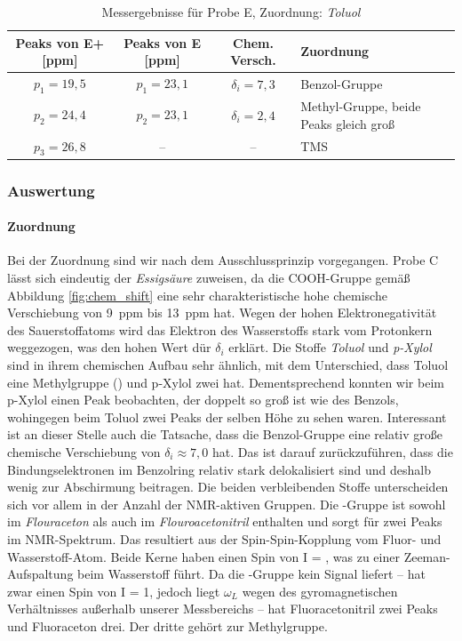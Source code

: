 \documentclass[a4paper]{scrartcl} %
\begin{document}
\begin{table}[!htb]
	\centering
	\caption{Messergebnisse für Probe E, Zuordnung: \emph{Toluol} }
	\label{tab:Probe_E}
	\begin{tabularx}{1.0\linewidth}{cccX}
	\toprule
	Peaks von E+ [ppm] & Peaks von E [ppm] & Chem. Versch. & Zuordnung \\
	\midrule
	$p_1 = 19,5$ & $p_1 = 23,1$ & $\delta_i = 7,3 $ & Benzol-Gruppe \\

	$p_2 = 24,4$ & $p_2 = 23,1$ & $\delta_i = 2,4$ & Methyl-Gruppe, beide Peaks gleich groß \\

	$p_3 = 26,8$ & -- & -- & TMS \\

	\bottomrule
	\end{tabularx}

\end{table}

\subsubsection{Auswertung}
\paragraph{Zuordnung}

Bei der Zuordnung sind wir nach dem Ausschlussprinzip vorgegangen. Probe C lässt sich eindeutig der \emph{Essigsäure} zuweisen, da die COOH-Gruppe gemäß Abbildung \ref{fig:chem_shift} eine sehr charakteristische hohe chemische Verschiebung von \SI{9}{ppm} bis \SI{13}{ppm} hat. Wegen der hohen Elektronegativität des Sauerstoffatoms wird das Elektron des Wasserstoffs stark vom Protonkern weggezogen, was den hohen Wert dür $\delta_i$ erklärt.
Die Stoffe \emph{Toluol} und \emph{p-Xylol} sind in ihrem chemischen Aufbau sehr ähnlich, mit dem Unterschied, dass Toluol eine Methylgruppe () und p-Xylol zwei hat. Dementsprechend konnten wir beim p-Xylol einen Peak beobachten, der doppelt so groß ist wie des Benzols, wohingegen beim Toluol zwei Peaks der selben Höhe zu sehen waren. Interessant ist an dieser Stelle auch die Tatsache, dass die Benzol-Gruppe eine relativ große chemische Verschiebung von $\delta_i \approx 7,0$ hat. Das ist darauf zurückzuführen, dass die Bindungselektronen im Benzolring relativ stark delokalisiert sind und deshalb wenig zur Abschirmung beitragen.
Die beiden verbleibenden Stoffe unterscheiden sich vor allem in der Anzahl der NMR-aktiven Gruppen. Die -Gruppe ist sowohl im \emph{Flouraceton} als auch im \emph{Flouroacetonitril} enthalten und sorgt für zwei Peaks im NMR-Spektrum. Das resultiert aus der Spin-Spin-Kopplung vom Fluor- und Wasserstoff-Atom. Beide Kerne haben einen Spin von I = , was zu einer Zeeman-Aufspaltung beim Wasserstoff führt. Da die -Gruppe kein Signal liefert --  hat zwar einen Spin von I = 1, jedoch liegt $\omega_L$ wegen des gyromagnetischen Verhältnisses außerhalb unserer Messbereichs -- hat Fluoracetonitril zwei Peaks und Fluoraceton drei. Der dritte gehört zur Methylgruppe.
\end{document}
